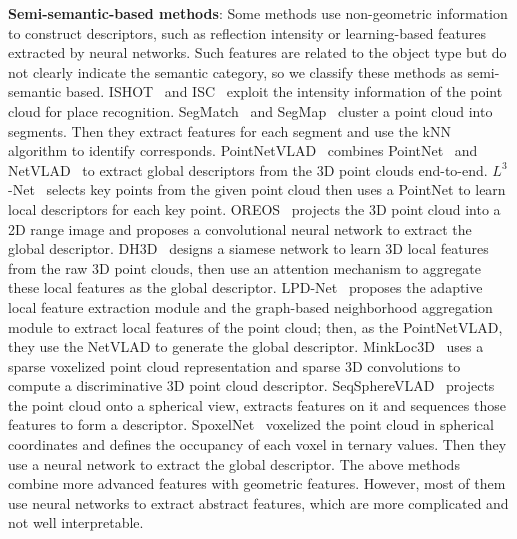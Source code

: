 \documentclass[letterpaper, 10 pt, conference]{ieeeconf}  %
\begin{document}
\textbf{Semi-semantic-based methods}: Some methods use non-geometric information to construct descriptors, such as reflection intensity or learning-based features extracted by neural networks. Such features are related to the object type but do not clearly indicate the semantic category, so we classify these methods as semi-semantic based. ISHOT~\cite{ISHOT} and ISC~\cite{ISC} exploit the intensity information of the point cloud for place recognition. SegMatch~\cite{segmatch} and SegMap~\cite{segmap2} cluster a point cloud into segments. Then they extract features for each segment and use the kNN algorithm to identify corresponds. PointNetVLAD~\cite{PV} combines PointNet~\cite{pointnet} and NetVLAD~\cite{netvlad} to extract global descriptors from the 3D point clouds end-to-end. \(L^3\)-Net~\cite{l3net} selects key points from the given point cloud then uses a PointNet to learn local descriptors for each key point. OREOS~\cite{oreos} projects the 3D point cloud into a 2D range image and proposes a convolutional neural network to extract the global descriptor. DH3D~\cite{dh3d} designs a siamese network to learn 3D local features from the raw 3D point clouds, then use an attention mechanism to aggregate these local features as the global descriptor. LPD-Net~\cite{lpdnet} proposes the adaptive local feature extraction module and the graph-based neighborhood aggregation module to extract local features of the point cloud; then, as the PointNetVLAD, they use the NetVLAD to generate the global descriptor. MinkLoc3D~\cite{minlock3d} uses a sparse voxelized point cloud representation and sparse 3D convolutions to compute a discriminative 3D point cloud descriptor. SeqSphereVLAD~\cite{SeqSphereVLAD} projects the point cloud onto a spherical view, extracts features on it and sequences those features to form a descriptor. SpoxelNet~\cite{spoxenet} voxelized the point cloud in spherical coordinates and defines the occupancy of each voxel in ternary values. Then they use a neural network to extract the global descriptor. The above methods combine more advanced features with geometric features. However, most of them use neural networks to extract abstract features, which are more complicated and not well interpretable.
\end{document}
